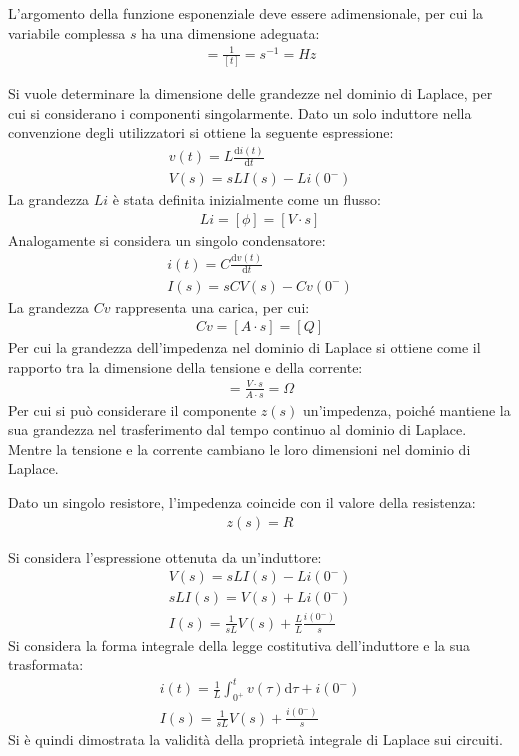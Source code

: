 \documentclass{article}
\newcommand{\df}{\mathrm{d}}
\numberwithin{equation}{subsection}
\begin{document}
L'argomento della funzione esponenziale deve essere adimensionale, per cui la variabile complessa $s$ ha una dimensione adeguata:
\begin{gather*}
    [s]=\displaystyle\frac{1}{[t]}=s^{-1}=Hz
\end{gather*}

Si vuole determinare la dimensione delle grandezze nel dominio di Laplace, per cui si considerano i componenti singolarmente. Dato un solo induttore nella convenzione degli 
utilizzatori si ottiene la seguente espressione:
\begin{gather*}
    v(t)=L\displaystyle\frac{\df i(t)}{\df t}\\
    V(s)=sLI(s)-Li(0^-)
\end{gather*}
La grandezza $Li$ è stata definita inizialmente come un flusso:
\begin{gather*}
    Li=[\phi]=[V\cdot s]
\end{gather*}
Analogamente si considera un singolo condensatore:
\begin{gather*}
    i(t)=C\displaystyle\frac{\df v(t)}{\df t}\\
    I(s)=sCV(s)-Cv(0^-)
\end{gather*}
La grandezza $Cv$ rappresenta una carica, per cui:
\begin{gather*}
    Cv=[A\cdot s]=[Q]
\end{gather*}
Per cui la grandezza dell'impedenza nel dominio di Laplace si ottiene come il rapporto tra la dimensione della tensione e della corrente:
\begin{gather*}
    [z]=\displaystyle\frac{V\cdot s}{A\cdot s}=\Omega
\end{gather*}
Per cui si può considerare il componente $z(s)$ un'impedenza, poiché mantiene la sua grandezza nel trasferimento dal tempo continuo al dominio di Laplace. Mentre la tensione 
e la corrente cambiano le loro dimensioni nel dominio di Laplace. 


Dato un singolo resistore, l'impedenza coincide con il valore della resistenza:
\begin{gather*}
    z(s)=R
\end{gather*}

Si considera l'espressione ottenuta da un'induttore:
\begin{gather*}
    V(s)=sLI(s)-Li(0^-)\\
    sLI(s)=V(s)+Li(0^-)\\
    I(s)=\displaystyle\frac{1}{sL}V(s)+\frac{L}{L}\frac{i(0^-)}{s}
\end{gather*}
Si considera la forma integrale della legge costitutiva dell'induttore e la sua trasformata:
\begin{gather*}
    i(t)=\displaystyle\frac{1}{L}\int_{0^+}^tv(\tau)\df\tau+i(0^-)\\
    I(s)=\displaystyle\frac{1}{sL}V(s)+\frac{i(0^-)}{s}
\end{gather*}
Si è quindi dimostrata la validità della proprietà integrale di Laplace sui circuiti. 
\end{document}
